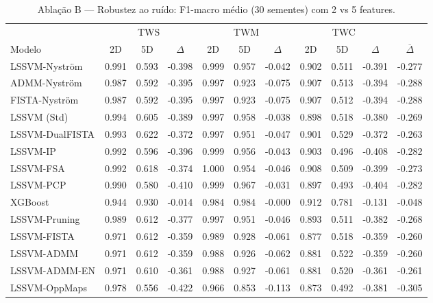 \begin{table}[ht]
  \centering
  \caption{Ablação B — Robustez ao ruído: F1-macro médio (30 sementes) com 2 vs 5 features.}
  \label{tab:ablation_b}
  \footnotesize
  \begin{tabular}{lcccccccccc}
    \toprule
    \multicolumn{1}{c}{} & \multicolumn{3}{c}{TWS} & \multicolumn{3}{c}{TWM} & \multicolumn{3}{c}{TWC} & \multicolumn{1}{c}{} \\
    \cmidrule(lr){2-4}\cmidrule(lr){5-7}\cmidrule(lr){8-10}
    Modelo & 2D & 5D & $\Delta$ & 2D & 5D & $\Delta$ & 2D & 5D & $\Delta$ & $\overline{\Delta}$ \\
    \midrule
    LSSVM-Nyström & 0.991 & 0.593 & -0.398 & 0.999 & 0.957 & -0.042 & 0.902 & 0.511 & -0.391 & -0.277 \\
    ADMM-Nyström & 0.987 & 0.592 & -0.395 & 0.997 & 0.923 & -0.075 & 0.907 & 0.513 & -0.394 & -0.288 \\
    FISTA-Nyström & 0.987 & 0.592 & -0.395 & 0.997 & 0.923 & -0.075 & 0.907 & 0.512 & -0.394 & -0.288 \\
    LSSVM (Std) & 0.994 & 0.605 & -0.389 & 0.997 & 0.958 & -0.038 & 0.898 & 0.518 & -0.380 & -0.269 \\
    LSSVM-DualFISTA & 0.993 & 0.622 & -0.372 & 0.997 & 0.951 & -0.047 & 0.901 & 0.529 & -0.372 & -0.263 \\
    LSSVM-IP & 0.992 & 0.596 & -0.396 & 0.999 & 0.956 & -0.043 & 0.903 & 0.496 & -0.408 & -0.282 \\
    LSSVM-FSA & 0.992 & 0.618 & -0.374 & 1.000 & 0.954 & -0.046 & 0.908 & 0.509 & -0.399 & -0.273 \\
    LSSVM-PCP & 0.990 & 0.580 & -0.410 & 0.999 & 0.967 & -0.031 & 0.897 & 0.493 & -0.404 & -0.282 \\
    XGBoost & 0.944 & 0.930 & -0.014 & 0.984 & 0.984 & -0.000 & 0.912 & 0.781 & -0.131 & -0.048 \\
    LSSVM-Pruning & 0.989 & 0.612 & -0.377 & 0.997 & 0.951 & -0.046 & 0.893 & 0.511 & -0.382 & -0.268 \\
    LSSVM-FISTA & 0.971 & 0.612 & -0.359 & 0.989 & 0.928 & -0.061 & 0.877 & 0.518 & -0.359 & -0.260 \\
    LSSVM-ADMM & 0.971 & 0.612 & -0.359 & 0.988 & 0.926 & -0.062 & 0.881 & 0.522 & -0.359 & -0.260 \\
    LSSVM-ADMM-EN & 0.971 & 0.610 & -0.361 & 0.988 & 0.927 & -0.061 & 0.881 & 0.520 & -0.361 & -0.261 \\
    LSSVM-OppMaps & 0.978 & 0.556 & -0.422 & 0.966 & 0.853 & -0.113 & 0.873 & 0.492 & -0.381 & -0.305 \\

\end{tabular}
\end{table}

